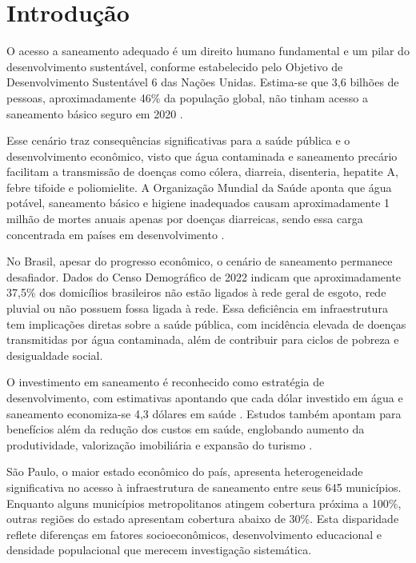 \documentclass[12pt, a4paper]{article}
\begin{document}
\newpage
\thispagestyle{empty}
\tableofcontents
\newpage

\setlength{\parindent}{1.25cm}
\section{Introdução}

O acesso a saneamento adequado é um direito humano fundamental e um pilar do desenvolvimento sustentável, conforme estabelecido pelo Objetivo de Desenvolvimento Sustentável 6 das Nações Unidas. Estima-se que 3,6 bilhões de pessoas, aproximadamente 46\% da população global, não tinham acesso a saneamento básico seguro em 2020 \cite{unwater2021sdg6}. 

Esse cenário traz consequências significativas para a saúde pública e o desenvolvimento econômico, visto que água contaminada e saneamento precário facilitam a transmissão de doenças como cólera, diarreia, disenteria, hepatite A, febre tifoide e poliomielite. A Organização Mundial da Saúde aponta que água potável, saneamento básico e higiene inadequados causam aproximadamente 1 milhão de mortes anuais apenas por doenças diarreicas, sendo essa carga concentrada em países em desenvolvimento \cite{oms2023sanitation}.

No Brasil, apesar do progresso econômico, o cenário de saneamento permanece desafiador. Dados do Censo Demográfico de 2022 \cite{ibge2022censo} indicam que aproximadamente 37,5\% dos domicílios brasileiros não estão ligados à rede geral de esgoto, rede pluvial ou não possuem fossa ligada à rede. Essa deficiência em infraestrutura tem implicações diretas sobre a saúde pública, com incidência elevada de doenças transmitidas por água contaminada, além de contribuir para ciclos de pobreza e desigualdade social. 

O investimento em saneamento é reconhecido como estratégia de desenvolvimento, com estimativas apontando que cada dólar investido em água e saneamento economiza-se 4,3 dólares em saúde \cite{onubrasil2014oms}. Estudos também apontam para benefícios além da redução dos custos em saúde, englobando aumento da produtividade, valorização imobiliária e expansão do turismo \cite{tratabrasil2022}. 

São Paulo, o maior estado econômico do país, apresenta heterogeneidade significativa no acesso à infraestrutura de saneamento entre seus 645 municípios. Enquanto alguns municípios metropolitanos atingem cobertura próxima a 100\%, outras regiões do estado apresentam cobertura abaixo de 30\%. Esta disparidade reflete diferenças em fatores socioeconômicos, desenvolvimento educacional e densidade populacional que merecem investigação sistemática.
\end{document}
